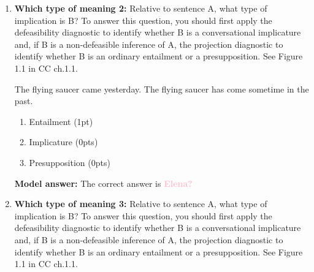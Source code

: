 \documentclass[a4,11pt]{article}
\newcommand{\jt}[1]{\textbf{\textcolor{Pink}{#1}}}
\begin{document}
\begin{enumerate}[leftmargin = 12pt]
 
   \begin{enumerate}[noitemsep]
        \item Entailment (0pts)
         \item Implicature (0pts)
           \item Presupposition (1pt)
    \end{enumerate}

{\bf Model answer:} The correct answer is presupposition. First, we apply the defeasibility diagnostic: because {\em The book that John bought was on sale, but John did not buy a book} is self-contradictory, B is a non-defeasible inference of sentence A. Next, we apply the projection diagnostic. The relevant versions of sentence A are the following: {\em The book that John bought was not on sale}, {\em Was the book that John bought on sale?} and {\em If the book that John bought was on sale, he will be happy}. Because sentence A implies inference B, and the versions of sentence A also imply B, B is not an ordinary entailment but a presupposition.
 
 \item {\bf Which type of meaning 2:} Relative to sentence A, what type of implication is B? To answer this question, you should first apply the defeasibility diagnostic to identify whether B is a conversational implicature and, if B is a non-defeasible inference of A, the projection diagnostic to identify whether B is an ordinary entailment or a presupposition. See Figure 1.1 in CC ch.1.1.
\begin{exe}
\exi{}
\begin{xlist}
  The flying saucer came yesterday.
 The flying saucer has come sometime in the past.
\end{xlist}
\end{exe}
   \begin{enumerate}[noitemsep]
        \item Entailment (1pt)
         \item Implicature (0pts)
           \item Presupposition (0pts)
    \end{enumerate}

 {\bf Model answer:} The correct answer is \jt{Elena?}
  
 \item {\bf Which type of meaning 3:} Relative to sentence A, what type of implication is B? To answer this question, you should first apply the defeasibility diagnostic to identify whether B is a conversational implicature and, if B is a non-defeasible inference of A, the projection diagnostic to identify whether B is an ordinary entailment or a presupposition. See Figure 1.1 in CC ch.1.1.


\end{enumerate}
\end{document}
